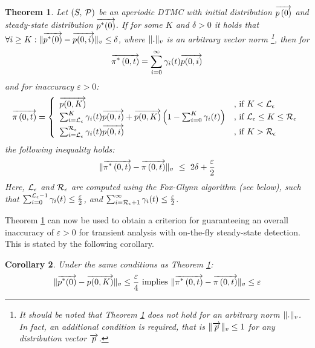 \documentclass[a4paper,11pt]{article}
\newtheorem{theorem}{Theorem}
\newtheorem{corollary}[theorem]{Corollary}
\begin{document}
		\begin{theorem}
			Let $\left( S,\: \mathcal{P} \right)$ be an aperiodic DTMC with initial distribution $\overrightarrow{p \left( 0 \right)}$ and steady-state distribution $\overrightarrow{p^{*}(0)}$. If for some $K$ and $\delta > 0$ it holds that $\forall i \geq K : \lVert \overrightarrow{p^{*}(0)} - \overrightarrow{p(0,i)} \rVert_{v} \leq \delta$, where $\lVert . \rVert_{v}$ is an arbitrary vector norm \footnote{It should be noted that Theorem \ref{th:error_fwd_initial} does not hold for an arbitrary norm $\lVert . \rVert_{v}$. In fact, an additional  condition is required, that is $\lVert \overrightarrow{p} \rVert_{v}\leq 1$ for any distribution vector $\overrightarrow{p}$.}, then for
			\begin{equation}
				\overrightarrow{\pi^{*} \left(0, t \right )} = \sum_{i=0}^{\infty}\gamma_{i}(t) \overrightarrow{p(0,i)} \nonumber
			\end{equation}
			and for inaccuracy $\varepsilon > 0$:
			\begin{equation}
				\displaystyle
				\overrightarrow{\pi \left(0, t \right )} = \left\{
				\begin{array}{ll}
					\overrightarrow{p(0,K)} & \text{, if } K < \mathcal{L}_{\epsilon}\\
					\sum_{i=\mathcal{L}_{\epsilon}}^{K}\gamma_{i}(t) \overrightarrow{p(0,i)} + \overrightarrow{p(0,K)} \left(1- \sum_{i=0}^{K}\gamma_{i}(t) \right) & \text{, if } \mathcal{L}_{\epsilon} \leq K \leq \mathcal{R}_{\epsilon}\\
					\sum_{i=\mathcal{L}_{\epsilon}}^{\mathcal{R}_{\epsilon}}\gamma_{i}(t) \overrightarrow{p(0,i)} & \text{, if } K > \mathcal{R}_{\epsilon}\\
				\end{array}
				\right .
				\label{eq:ssd_LR_initial}
			\end{equation}
			the following inequality holds:
			\begin{equation}
				\nvec{\vpipOt - \vpiOt} \ \leq \ 2 \delta + \frac{\varepsilon}{2} \nonumber
			\end{equation}
			Here, $\mathcal{L}_{\epsilon}$ and $\mathcal{R}_{\epsilon}$ are computed using the Fox-Glynn algorithm (see below), such that $\sum_{i=0}^{\mathcal{L}_{\epsilon}-1} \gamma_{i}(t) \leq \frac{\varepsilon}{2}$, and $\sum_{i=\mathcal{R}_{\epsilon}+1}^{\infty} \gamma_{i}(t) \leq \frac{\varepsilon}{2}$.
			\label{th:error_fwd_initial}
		\end{theorem}
		
		Theorem \ref{th:error_fwd_initial} can now be used to obtain a criterion for guaranteeing an overall inaccuracy of $\varepsilon > 0$ for transient analysis with on-the-fly steady-state detection.  This is stated by the following corollary.
		
		\begin{corollary}
			Under the same conditions as Theorem \ref{th:error_fwd_initial}: 
				\begin{equation}
					\lVert \overrightarrow{p^{*}(0)} - \overrightarrow{p(0,K)} \rVert_{v} \leq \frac{\varepsilon}{4} \text{ implies } \lVert \overrightarrow{\pi^{*} \left(0, t \right )} - \overrightarrow{\pi \left(0, t \right )} \rVert_{v} \leq \varepsilon
					\label{eq:malh_cr_cor}
				\end{equation}
			\label{cl:error_fwd_initial}
 		\end{corollary}
\end{document}
